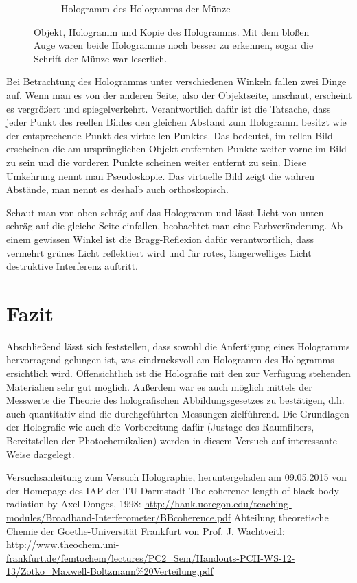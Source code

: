 \documentclass[bigchapter,colorback,accentcolor=tud4b,linedtoc,11pt]{tudreport}
\begin{document}
\begin{figure}[H]
\begin{subfigure}[h]{0.3\textwidth}
    \caption{Hologramm des Hologramms der Münze}
    \label{fig:gedenkholokopie}
  \end{subfigure}
  \caption{Objekt, Hologramm und Kopie des Hologramms. Mit dem bloßen Auge waren
  beide Hologramme noch besser zu erkennen, sogar die Schrift der Münze war leserlich.}\label{fig:genkhologramme}
\end{figure}

\color{blue}
Bei Betrachtung des Hologramms unter verschiedenen Winkeln fallen zwei Dinge auf. Wenn man es von der anderen Seite, also der Objektseite, anschaut, erscheint es vergrößert und spiegelverkehrt. Verantwortlich dafür ist die Tatsache, dass jeder Punkt des reellen Bildes den gleichen Abstand zum Hologramm besitzt wie der entsprechende Punkt des virtuellen Punktes. Das bedeutet, im rellen Bild erscheinen die am ursprünglichen Objekt entfernten Punkte weiter vorne im Bild zu sein und die vorderen Punkte scheinen weiter entfernt zu sein. Diese Umkehrung nennt man Pseudoskopie. Das virtuelle Bild zeigt die wahren Abstände, man nennt es deshalb auch orthoskopisch.

Schaut man von oben schräg auf das Hologramm und lässt Licht von unten schräg auf die gleiche Seite einfallen, beobachtet man eine Farbveränderung. Ab einem gewissen Winkel ist die Bragg-Reflexion dafür verantwortlich, dass vermehrt grünes Licht reflektiert wird und für rotes, längerwelliges Licht destruktive Interferenz auftritt.
\color{black}

\chapter{Fazit}

Abschließend lässt sich feststellen, dass sowohl die Anfertigung eines Hologramms hervorragend gelungen ist, was eindrucksvoll am Hologramm des Hologramms ersichtlich wird. Offensichtlich ist die Holografie mit den zur Verfügung stehenden Materialien sehr gut möglich. Außerdem war es auch möglich mittels der Messwerte die Theorie des holografischen Abbildungsgesetzes zu bestätigen, d.h. auch quantitativ sind die durchgeführten Messungen zielführend. Die Grundlagen der Holografie wie auch die Vorbereitung dafür (Justage des Raumfilters, Bereitstellen der Photochemikalien) werden in diesem Versuch auf interessante Weise dargelegt.

\cleardoublepage{}
\newpage
\begin{thebibliography}{100}
   Versuchsanleitung zum Versuch Holographie, heruntergeladen am 09.05.2015 von der Homepage des IAP der TU Darmstadt
   The coherence length of black-body
radiation by Axel Donges, 1998: \url{http://hank.uoregon.edu/teaching-modules/Broadband-Interferometer/BBcoherence.pdf}
   Abteilung theoretische Chemie der Goethe-Universität
    Frankfurt von Prof. J. Wachtveitl: \url{http://www.theochem.uni-frankfurt.de/femtochem/lectures/PC2_Sem/Handouts-PCII-WS-12-13/Zotko_Maxwell-Boltzmann%20Verteilung.pdf}
\end{thebibliography}
\end{document}
